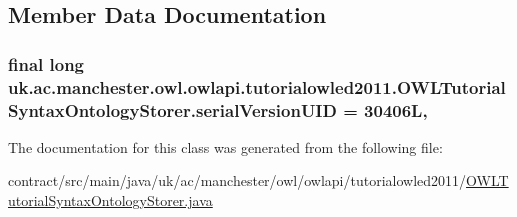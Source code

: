 \subsection{Member Data Documentation}
\hypertarget{classuk_1_1ac_1_1manchester_1_1owl_1_1owlapi_1_1tutorialowled2011_1_1_o_w_l_tutorial_syntax_ontology_storer_a640d7439147c30065be506c8d4dbc073}{
\subsubsection[{serial\-Version\-U\-I\-D}]{\setlength{\rightskip}{0pt plus 5cm}final long uk.\-ac.\-manchester.\-owl.\-owlapi.\-tutorialowled2011.\-O\-W\-L\-Tutorial\-Syntax\-Ontology\-Storer.\-serial\-Version\-U\-I\-D = 30406\-L\hspace{0.3cm}{\ttfamily [static]}, {\ttfamily [private]}}}\label{classuk_1_1ac_1_1manchester_1_1owl_1_1owlapi_1_1tutorialowled2011_1_1_o_w_l_tutorial_syntax_ontology_storer_a640d7439147c30065be506c8d4dbc073}


The documentation for this class was generated from the following file\-:\begin{DoxyCompactItemize}
\item 
contract/src/main/java/uk/ac/manchester/owl/owlapi/tutorialowled2011/\hyperlink{main_2java_2uk_2ac_2manchester_2owl_2owlapi_2tutorialowled2011_2_o_w_l_tutorial_syntax_ontology_storer_8java}{O\-W\-L\-Tutorial\-Syntax\-Ontology\-Storer.\-java}\end{DoxyCompactItemize}
